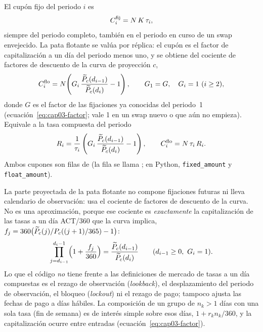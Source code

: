 El cupón fijo del periodo $i$ es
\begin{equation}\label{eq:cap03-cupon-fijo}
  C^{\mathrm{fij}}_i=N\,K\,\tau_i ,
\end{equation}
siempre del periodo completo, también en el periodo en curso de un swap envejecido. La pata flotante se valúa
por réplica: el cupón es el factor de capitalización a un día del periodo menos uno, y se obtiene del cociente
de factores de descuento de la curva de proyección $c$,
\begin{equation}\label{eq:cap03-cupon-flotante}
  C^{\mathrm{flo}}_i=N\!\left(G_i\,\frac{\widetilde P_c(d_{i-1})}{\widetilde P_c(d_i)}-1\right),
  \qquad G_1=G,\quad G_i=1\ (i\ge2),
\end{equation}
donde $G$ es el factor de las fijaciones ya conocidas del periodo~1
(ecuación~\eqref{eq:cap03-factor}; vale 1 en un swap nuevo o que aún no empieza). Equivale a la tasa
compuesta del periodo
\begin{equation}\label{eq:cap03-tasa-compuesta}
  R_{i}=\frac{1}{\tau_i}\left(G_i\,\frac{\widetilde P_c(d_{i-1})}{\widetilde P_c(d_i)}-1\right),
  \qquad C^{\mathrm{flo}}_i=N\,\tau_i\,R_{i}.
\end{equation}
Ambos cupones son filas de  (la fila se llama
; en Python, \texttt{fixed\_amount} y
\texttt{float\_amount}).

\begin{diferencia}
  La parte proyectada de la pata flotante no compone fijaciones futuras ni lleva calendario de observación:
  usa el cociente de factores de descuento de la curva. No es una aproximación, porque ese cociente es
  \emph{exactamente} la capitalización de las tasas a un día ACT/360 que la curva implica,
  $f_j=360\bigl(\widetilde P_c(j)/P_{c}((j+1)/365)-1\bigr)$:
  \[
    \prod_{j=d_{i-1}}^{d_i-1}\Bigl(1+\frac{f_j}{360}\Bigr)=\frac{\widetilde P_c(d_{i-1})}{\widetilde P_c(d_i)}
    \qquad(d_{i-1}\ge0,\ G_i=1).
  \]
  Lo que el código \emph{no} tiene frente a las definiciones de mercado de tasas a un día compuestas
  \citep{isda2021} es el rezago de observación (\emph{lookback}), el desplazamiento del periodo de
  observación, el bloqueo (\emph{lockout}) ni el rezago de pago; tampoco ajusta las fechas de pago a días hábiles. La composición de un grupo de
  $n_k>1$ días con una sola tasa (fin de semana) es de interés simple sobre esos días,
  $1+r_kn_k/360$, y la capitalización ocurre entre entradas (ecuación~\eqref{eq:cap03-factor}).
\end{diferencia}


